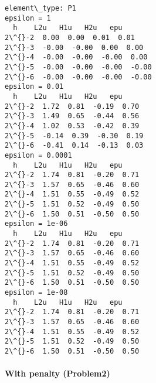 \documentclass[11pt]{article}
\begin{document}
    \begin{Verbatim}[commandchars=\\\{\}]
element\_type: P1
epsilon = 1
  h    L2u   H1u   H2u   epu
2\^{}-2  0.00  0.00  0.01  0.01
2\^{}-3  -0.00  -0.00  0.00  0.00
2\^{}-4  -0.00  -0.00  -0.00  0.00
2\^{}-5  -0.00  -0.00  -0.00  -0.00
2\^{}-6  -0.00  -0.00  -0.00  -0.00
epsilon = 0.01
  h    L2u   H1u   H2u   epu
2\^{}-2  1.72  0.81  -0.19  0.70
2\^{}-3  1.49  0.65  -0.44  0.56
2\^{}-4  1.02  0.53  -0.42  0.39
2\^{}-5  -0.14  0.39  -0.30  0.19
2\^{}-6  -0.41  0.14  -0.13  0.03
epsilon = 0.0001
  h    L2u   H1u   H2u   epu
2\^{}-2  1.74  0.81  -0.20  0.71
2\^{}-3  1.57  0.65  -0.46  0.60
2\^{}-4  1.51  0.55  -0.49  0.52
2\^{}-5  1.51  0.52  -0.49  0.50
2\^{}-6  1.50  0.51  -0.50  0.50
epsilon = 1e-06
  h    L2u   H1u   H2u   epu
2\^{}-2  1.74  0.81  -0.20  0.71
2\^{}-3  1.57  0.65  -0.46  0.60
2\^{}-4  1.51  0.55  -0.49  0.52
2\^{}-5  1.51  0.52  -0.49  0.50
2\^{}-6  1.50  0.51  -0.50  0.50
epsilon = 1e-08
  h    L2u   H1u   H2u   epu
2\^{}-2  1.74  0.81  -0.20  0.71
2\^{}-3  1.57  0.65  -0.46  0.60
2\^{}-4  1.51  0.55  -0.49  0.52
2\^{}-5  1.51  0.52  -0.49  0.50
2\^{}-6  1.50  0.51  -0.50  0.50
    \end{Verbatim}

    \paragraph{With penalty (Problem2)}\label{with-penalty-problem2}
\end{document}
